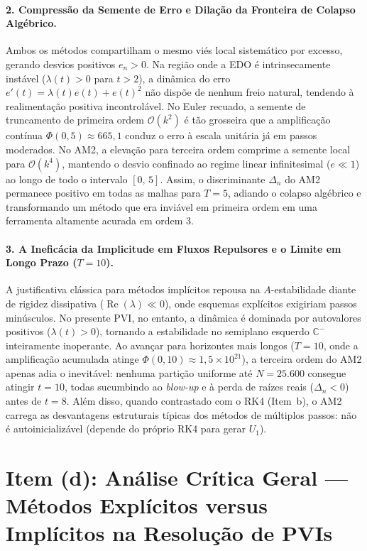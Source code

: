 \documentclass[12pt, a4paper]{article}
\begin{document}
\paragraph{2. Compressão da Semente de Erro e Dilação da Fronteira de Colapso Algébrico.}
Ambos os métodos compartilham o mesmo viés local sistemático por excesso, gerando desvios positivos $e_n > 0$. Na região onde a EDO é intrinsecamente instável ($\lambda(t) > 0$ para $t > 2$), a dinâmica do erro $e'(t) = \lambda(t)e(t) + e(t)^2$ não dispõe de nenhum freio natural, tendendo à realimentação positiva incontrolável. No Euler recuado, a semente de truncamento de primeira ordem $\mathcal{O}(k^2)$ é tão grosseira que a amplificação contínua $\Phi(0, 5) \approx 665{,}1$ conduz o erro à escala unitária já em passos moderados. No AM2, a elevação para terceira ordem comprime a semente local para $\mathcal{O}(k^4)$, mantendo o desvio confinado ao regime linear infinitesimal ($e \ll 1$) ao longo de todo o intervalo $[0,\, 5]$. Assim, o discriminante $\Delta_n$ do AM2 permanece positivo em todas as malhas para $T = 5$, adiando o colapso algébrico e transformando um método que era inviável em primeira ordem em uma ferramenta altamente acurada em ordem 3.

\paragraph{3. A Ineficácia da Implicitude em Fluxos Repulsores e o Limite em Longo Prazo ($T = 10$).}
A justificativa clássica para métodos implícitos repousa na $A$-estabilidade diante de rigidez dissipativa ($\operatorname{Re}(\lambda) \ll 0$), onde esquemas explícitos exigiriam passos minúsculos. No presente PVI, no entanto, a dinâmica é dominada por autovalores positivos ($\lambda(t) > 0$), tornando a estabilidade no semiplano esquerdo $\mathbb{C}^-$ inteiramente inoperante. Ao avançar para horizontes mais longos ($T = 10$, onde a amplificação acumulada atinge $\Phi(0, 10) \approx 1{,}5 \times 10^{21}$), a terceira ordem do AM2 apenas adia o inevitável: nenhuma partição uniforme até $N = 25.600$ consegue atingir $t = 10$, todas sucumbindo ao \emph{blow-up} e à perda de raízes reais ($\Delta_n < 0$) antes de $t = 8$. Além disso, quando contrastado com o RK4 (Item~b), o AM2 carrega as desvantagens estruturais típicas dos métodos de múltiplos passos: não é autoinicializável (depende do próprio RK4 para gerar $U_1$).
\section{Item (d): Análise Crítica Geral — Métodos Explícitos versus Implícitos na Resolução de PVIs}
\label{sec:item-d}
\end{document}
